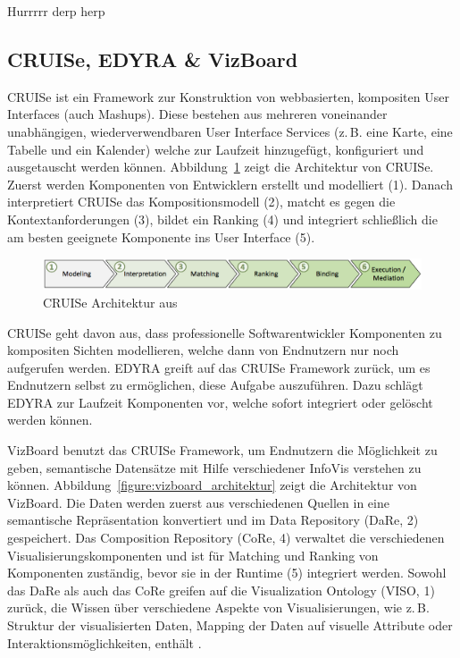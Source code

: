 \documentclass[
	headsepline,
	footsepline,
	fontsize=12pt,
	bibliography=totoc
]{scrbook}
\begin{document}
Hurrrrr derp herp

\subsection{CRUISe, EDYRA \& VizBoard}
\label{section:standderforschung:grundlagen:cruise_vizboard}

CRUISe \cite{Pietschmann2009, Pietschmann2012} ist ein Framework zur Konstruktion von webbasierten, kompositen User Interfaces (auch Mashups). Diese bestehen aus mehreren voneinander unabhängigen, wiederverwendbaren User Interface Services (z.\,B. eine Karte, eine Tabelle und ein Kalender) welche zur Laufzeit hinzugefügt, konfiguriert und ausgetauscht werden können. Abbildung~\ref{figure:cruise_architektur} zeigt die Architektur von CRUISe. Zuerst werden Komponenten von Entwicklern erstellt und modelliert (1). Danach interpretiert CRUISe das Kompositionsmodell (2), matcht es gegen die Kontextanforderungen (3), bildet ein Ranking (4) und integriert schließlich die am besten geeignete Komponente ins User Interface (5).

\begin{figure}[htbp]
	\centering
	\includegraphics[width=\textwidth]{images/grundlagen-cruise_component_integration.png}
	\caption{CRUISe Architektur aus \cite{Pietschmann2012}}
	\label{figure:cruise_architektur}
\end{figure}

CRUISe geht davon aus, dass professionelle Softwarentwickler Komponenten zu kompositen Sichten modellieren, welche dann von Endnutzern nur noch aufgerufen werden. EDYRA \cite{Ruempel2011} greift auf das CRUISe Framework zurück, um es Endnutzern selbst zu ermöglichen, diese Aufgabe auszuführen. Dazu schlägt EDYRA zur Laufzeit Komponenten vor, welche sofort integriert oder gelöscht werden können.

VizBoard \cite{Voigt2013} benutzt das CRUISe Framework, um Endnutzern die Möglichkeit zu geben, semantische Datensätze mit Hilfe verschiedener InfoVis verstehen zu können. Abbildung~\ref{figure:vizboard_architektur} zeigt die Architektur von VizBoard. Die Daten werden zuerst aus verschiedenen Quellen in eine semantische Repräsentation konvertiert und im Data Repository (DaRe, 2) gespeichert. Das Composition Repository (CoRe, 4) verwaltet die verschiedenen Visualisierungskomponenten und ist für Matching und Ranking von Komponenten zuständig, bevor sie in der Runtime (5) integriert werden. Sowohl das DaRe als auch das CoRe greifen auf die Visualization Ontology (VISO, 1) zurück, die Wissen über verschiedene Aspekte von Visualisierungen, wie z.\,B. Struktur der visualisierten Daten, Mapping der Daten auf visuelle Attribute oder Interaktionsmöglichkeiten, enthält \cite{Polowinski2013}.
\end{document}
